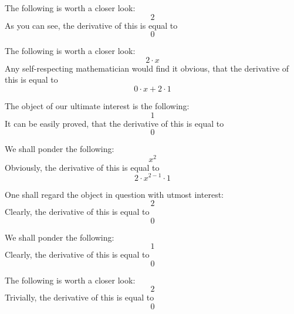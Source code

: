 \documentclass{article}
\begin{document}
The following is worth a closer look:
\begin{equation}
2 
\end{equation}
As you can see, the derivative of this is equal to
\begin{equation}
0 
\end{equation}

The following is worth a closer look:
\begin{equation}
2 \cdot x 
\end{equation}
Any self-respecting mathematician would find it obvious, that the derivative of this is equal to
\begin{equation}
0 \cdot x + 2 \cdot 1 
\end{equation}

The object of our ultimate interest is the following:
\begin{equation}
1 
\end{equation}
It can be easily proved, that the derivative of this is equal to
\begin{equation}
0 
\end{equation}

We shall ponder the following:
\begin{equation}
x ^{2 } 
\end{equation}
Obviously, the derivative of this is equal to
\begin{equation}
2 \cdot x ^{2 - 1 } \cdot 1 
\end{equation}

One shall regard the object in question with utmost interest:
\begin{equation}
2 
\end{equation}
Clearly, the derivative of this is equal to
\begin{equation}
0 
\end{equation}

We shall ponder the following:
\begin{equation}
1 
\end{equation}
Clearly, the derivative of this is equal to
\begin{equation}
0 
\end{equation}

The following is worth a closer look:
\begin{equation}
2 
\end{equation}
Trivially, the derivative of this is equal to
\begin{equation}
0 
\end{equation}
\end{document}
